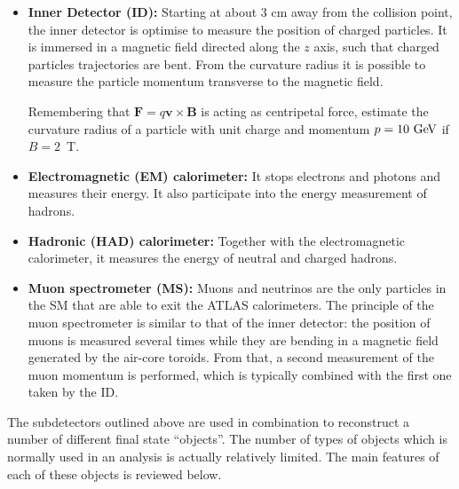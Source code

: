 \begin{itemize}

\item \textbf{Inner Detector (ID):} Starting at about 3 cm away from the collision point, the inner detector is optimise to measure the position of charged particles. It is immersed in a magnetic field directed along the $z$ axis, such that charged particles trajectories are bent. From the curvature radius it is possible to measure the particle momentum transverse to the magnetic field. 

\begin{mybox}
\begin{ExerciseList}
\Exercise Remembering that $\mathbf{F} = q \mathbf{v} \times \mathbf{B}$ is acting as centripetal force, estimate the curvature radius of a particle with unit charge and momentum $p = 10\ \text{Ge\kern -0.1em V}$ if $B = 2$~T. 
\end{ExerciseList}
\end{mybox} 

\item \textbf{Electromagnetic (EM) calorimeter:} It stops electrons and photons and measures their energy. It also participate into the energy measurement of hadrons. 
\item \textbf{Hadronic (HAD) calorimeter:} Together with the electromagnetic calorimeter, it measures the energy of neutral and charged hadrons. 
\item \textbf{Muon spectrometer (MS):} Muons and neutrinos are the only particles in the SM that are able to exit the ATLAS calorimeters. The principle of the muon spectrometer is similar to that of the inner detector: the position of muons is measured several times while they are bending in a magnetic field generated by the air-core toroids. From that, a second measurement of the muon momentum is performed, which is typically  combined with the first one taken by the ID. 
\end{itemize}

The subdetectors outlined above are used in combination to reconstruct a number of different final state ``objects''. The number of types of objects which is normally used in an analysis is actually relatively limited. The main features of each of these objects is reviewed below. 

